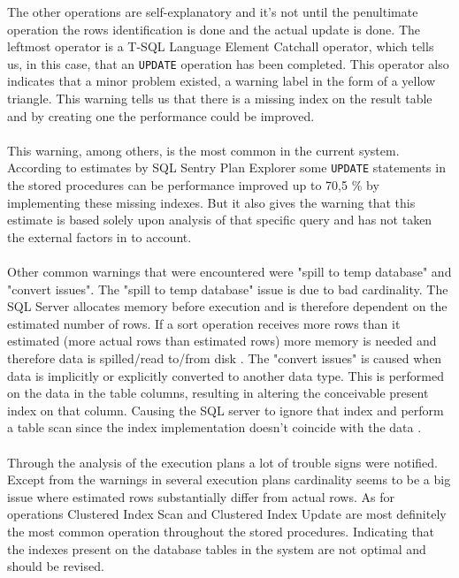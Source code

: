 \documentclass{cslthse-msc}
\begin{document}
The other operations are self-explanatory and it's not until the penultimate operation the rows identification is done and the actual update is done. The leftmost operator is a T-SQL Language Element Catchall operator, which tells us, in this case, that an \texttt{UPDATE} operation has been completed. This operator also indicates that a minor problem existed, a warning label in the form of a yellow triangle. This warning tells us that there is a missing index on the result table and by creating one the performance could be improved.\\\\
This warning, among others, is the most common in the current system. According to estimates by SQL Sentry Plan Explorer some \texttt{UPDATE} statements in the stored procedures can be performance improved up to 70,5 \% by implementing these missing indexes. But it also gives the warning that this estimate is based solely upon analysis of that specific query and has not taken the external factors in to account.\\\\ 
Other common warnings that were encountered were "spill to temp database" and "convert issues". The "spill to temp database" issue is due to bad cardinality. The SQL Server allocates memory before execution and is therefore dependent on the estimated number of rows. If a sort operation receives more rows than it estimated (more actual rows than estimated rows) more memory is needed and therefore data is spilled/read to/from disk \cite{sortissues}. The "convert issues" is caused when data is implicitly or explicitly converted to another data type. This is performed on the data in the table columns, resulting in altering the conceivable present index on that column. Causing the SQL server to ignore that index and perform a table scan since the index implementation doesn't coincide with the data \cite{convertissues}.\\\\
Through the analysis of the execution plans a lot of trouble signs were notified. Except from the warnings in several execution plans cardinality seems to be a big issue where estimated rows substantially differ from actual rows. As for operations Clustered Index Scan and Clustered Index Update are most definitely the most common operation throughout the stored procedures. Indicating that the indexes present on the database tables in the system are not optimal and should be revised.    

\newpage
\end{document}
